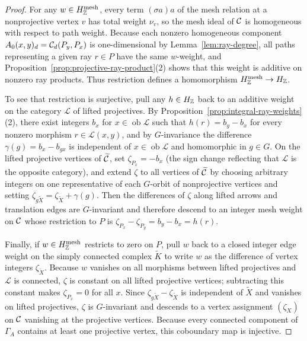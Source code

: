 \begin{proof}
For any $w\in H^{\mathrm{mesh}}_{\mathbb Z}$, every term $(\sigma a)a$ of the mesh
relation at a nonprojective vertex $v$ has total weight $\nu_v$, so the mesh
ideal of $\mathcal C$ is homogeneous with respect to path weight. Because each
nonzero homogeneous component $A_0(x,y)_d=\mathcal C_d(P_y,P_x)$ is one-dimensional
by Lemma~\ref{lem:ray-degree}, all paths representing a given ray $r\in P$
have the same $w$-weight, and Proposition~\ref{prop:projective-ray-product}(2)
shows that this weight is additive on nonzero ray products. Thus restriction
defines a homomorphism $H^{\mathrm{mesh}}_{\mathbb Z}\to H_{\mathbb Z}$.

To see that restriction is surjective, pull any $h\in H_{\mathbb Z}$ back to an
additive weight on the category $\mathcal L$ of lifted projectives. By
Proposition~\ref{prop:integral-ray-weights}(2), there exist integers $b_x$
for $x\in\operatorname{ob}\mathcal L$ such that $h(r)=b_y-b_x$ for every
nonzero morphism $r\in\mathcal L(x,y)$, and by $G$-invariance the difference
$\gamma(g)=b_x-b_{gx}$ is independent of $x\in\operatorname{ob}\mathcal L$
and homomorphic in $g\in G$. On the lifted projective vertices of
$\widetilde{\mathcal C}$, set $\zeta_{P_x}=-b_x$ (the sign change reflecting that
$\mathcal L$ is the opposite category), and extend $\zeta$ to all vertices of
$\widetilde{\mathcal C}$ by choosing arbitrary integers on one representative of each
$G$-orbit of nonprojective vertices and setting
$\zeta_{g\widetilde X}=\zeta_{\widetilde X}+\gamma(g)$. Then the differences
of $\zeta$ along lifted arrows and translation edges are $G$-invariant and
therefore descend to an integer mesh weight on $\mathcal C$ whose restriction to $P$
is $\zeta_{P_x}-\zeta_{P_y}=b_y-b_x=h(r)$.

Finally, if $w\in H^{\mathrm{mesh}}_{\mathbb Z}$ restricts to zero on $P$, pull $w$
back to a closed integer edge weight on the simply connected complex
$\widetilde K$ to write $w$ as the difference of vertex integers
$\zeta_{\widetilde X}$. Because $w$ vanishes on all morphisms between lifted
projectives and $\mathcal L$ is connected, $\zeta$ is constant on all lifted
projective vertices; subtracting this constant makes $\zeta_{P_x}=0$ for all
$x$. Since $\zeta_{g\widetilde X}-\zeta_{\widetilde X}$ is independent of
$\widetilde X$ and vanishes on lifted projectives, $\zeta$ is $G$-invariant
and descends to a vertex assignment $(\zeta_X)$ on $\mathcal C$ vanishing at the
projective vertices. Because every connected component of $\Gamma_A$ contains
at least one projective vertex, this coboundary map is injective.
\end{proof}

